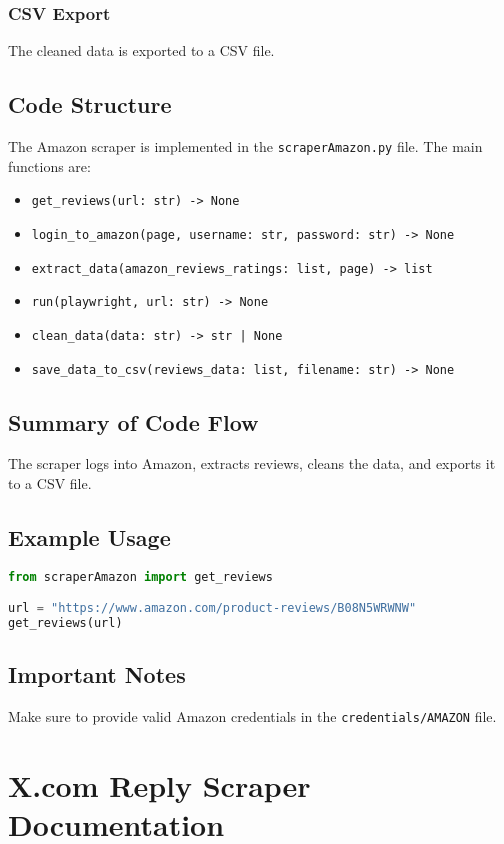 \documentclass[a4paper]{article}
\begin{document}
\subsubsection{CSV Export}
The cleaned data is exported to a CSV file.

\subsection{Code Structure}
The Amazon scraper is implemented in the \texttt{scraperAmazon.py} file. The main functions are:
\begin{itemize}
    \item \texttt{get\_reviews(url: str) -> None}
    \item \texttt{login\_to\_amazon(page, username: str, password: str) -> None}
    \item \texttt{extract\_data(amazon\_reviews\_ratings: list, page) -> list}
    \item \texttt{run(playwright, url: str) -> None}
    \item \texttt{clean\_data(data: str) -> str | None}
    \item \texttt{save\_data\_to\_csv(reviews\_data: list, filename: str) -> None}
\end{itemize}

\subsection{Summary of Code Flow}
The scraper logs into Amazon, extracts reviews, cleans the data, and exports it to a CSV file.

\subsection{Example Usage}
\begin{lstlisting}[language=python]
from scraperAmazon import get_reviews

url = "https://www.amazon.com/product-reviews/B08N5WRWNW"
get_reviews(url)
\end{lstlisting}

\subsection{Important Notes}
Make sure to provide valid Amazon credentials in the \texttt{credentials/AMAZON} file.

\section{X.com Reply Scraper Documentation}
\end{document}
